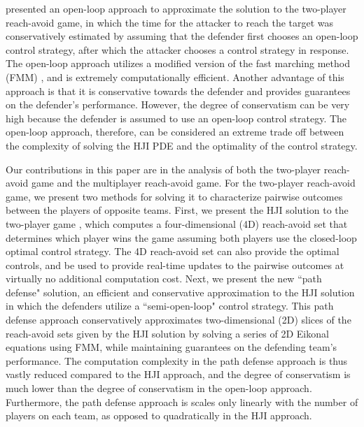 \cite{Zhou2012} presented an open-loop approach to approximate the solution to the two-player reach-avoid game, in which the time for the attacker to reach the target was conservatively estimated by assuming that the defender first chooses an open-loop control strategy, after which the attacker chooses a control strategy in response. The open-loop approach utilizes a modified version of the fast marching method (FMM) \cite{Sethian1996,Zhou2012}, and is extremely computationally efficient. Another advantage of this approach is that it is conservative towards the defender and provides guarantees on the defender's performance. However, the degree of conservatism can be very high because the defender is assumed to use an open-loop control strategy. The open-loop approach, therefore, can be considered an extreme trade off between the complexity of solving the HJI PDE and the optimality of the control strategy. 

Our contributions in this paper are in the analysis of both the two-player reach-avoid game and the multiplayer reach-avoid game.  For the two-player reach-avoid game, we present two methods for solving it to characterize pairwise outcomes between the players of opposite teams. First, we present the HJI solution to the two-player game \cite{Huang2011}, which computes a four-dimensional (4D) reach-avoid set that determines which player wins the game assuming both players use the closed-loop optimal control strategy. The 4D reach-avoid set can also provide the optimal controls, and be used to provide real-time updates to the pairwise outcomes at virtually no additional computation cost. Next, we present the new ``path defense" solution, an efficient and conservative approximation to the HJI solution in which the defenders utilize a ``semi-open-loop" control strategy. This path defense approach conservatively approximates two-dimensional (2D) slices of the reach-avoid sets given by the HJI solution by solving a series of 2D Eikonal equations using FMM, while maintaining guarantees on the defending team's performance. The computation complexity in the path defense approach is thus vastly reduced compared to the HJI approach, and the degree of conservatism is much lower than the degree of conservatism in the open-loop approach. Furthermore, the path defense approach is scales only linearly with the number of players on each team, as opposed to quadratically in the HJI approach.

